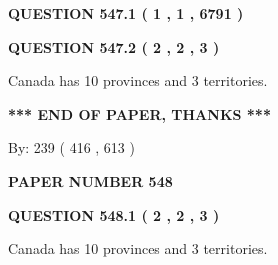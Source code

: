 \documentclass[12pt]{article}
\begin{document}
   
  
\vspace{0.2in}
  
{\textbf{\Large{QUESTION
547.1 
 ( 1 , 1 , 6791 )
}}}
  
  
  
\vspace{0.2in}
  
{\textbf{\Large{QUESTION
547.2 
 ( 2 , 2 , 3 )
}}}
  
  
 
 
\noindent{}
 
 
Canada has 10  provinces and 3 territories.
 
 
 
 
   
   
 \vspace{0.2in}
 
   
   
   
   
\vspace{1.0in} 
{\textbf{\large{ *** END OF PAPER, THANKS *** }}} 
   
   
\hspace{1.0in} By: 
 239 ( 416 ,  613 )
   
   
   
   
\newpage 
\setcounter{page}{ 
   548001 } 
   
   
   
   
 {\textbf{ \Large{ PAPER NUMBER  548  }}}
   
   
\vspace{0.2in}
   
   
   
   
   
   
 \vspace{0.2in}
 
 
 
 
   
   
  
\vspace{0.2in}
  
{\textbf{\Large{QUESTION
548.1 
 ( 2 , 2 , 3 )
}}}
  
  
 
 
\noindent{}
 
 
Canada has 10  provinces and 3 territories.
 
\end{document}
